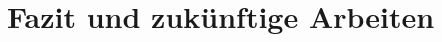 \documentclass[pdftex,12pt,a4paper]{report}
\begin{document}

\chapter{Fazit und zukünftige Arbeiten}
\label{chp:fazit}



\appendix






    


\nocite{zureiki2008stereo}
\nocite{opencvoreilly}
\nocite{cyganek2011introduction}

\end{document}

